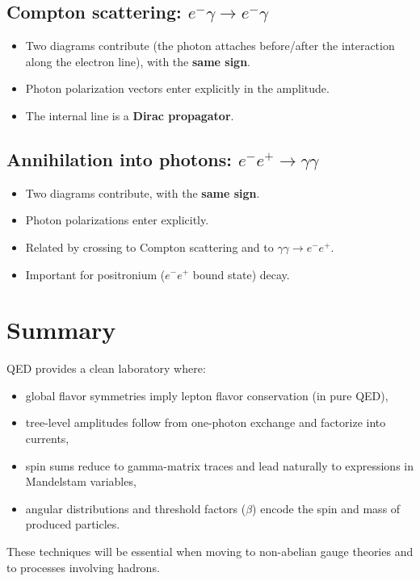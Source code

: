 \subsection{Compton scattering: $e^-\gamma \to e^-\gamma$}
\begin{itemize}
  \item Two diagrams contribute (the photon attaches before/after the interaction along the electron line), with the \textbf{same sign}.
  \item Photon polarization vectors enter explicitly in the amplitude.
  \item The internal line is a \textbf{Dirac propagator}.
\end{itemize}

\subsection{Annihilation into photons: $e^-e^+ \to \gamma\gamma$}
\begin{itemize}
  \item Two diagrams contribute, with the \textbf{same sign}.
  \item Photon polarizations enter explicitly.
  \item Related by crossing to Compton scattering and to $\gamma\gamma\to e^-e^+$.
  \item Important for positronium ($e^-e^+$ bound state) decay.
\end{itemize}

\section{Summary}
QED provides a clean laboratory where:
\begin{itemize}
  \item global flavor symmetries imply lepton flavor conservation (in pure QED),
  \item tree-level amplitudes follow from one-photon exchange and factorize into currents,
  \item spin sums reduce to gamma-matrix traces and lead naturally to expressions in Mandelstam variables,
  \item angular distributions and threshold factors ($\beta$) encode the spin and mass of produced particles.
\end{itemize}
These techniques will be essential when moving to non-abelian gauge theories and to processes
involving hadrons.